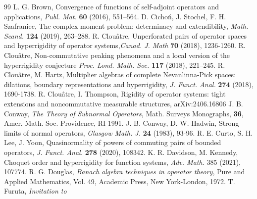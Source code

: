\documentclass[reqno]{amsproc}
\numberwithin{equation}{section}
\theoremstyle{remark}
\theoremstyle{definition}
\begin{document}
\begin{thebibliography}{99}
    L. G. Brown, Convergence of functions of
self-adjoint operators and applications,
{\em Publ. Mat.} {\bf 60} (2016), 551--564.
D. Cicho\'{n}, J. Stochel, F. H. Szafraniec, The
complex moment problem: determinacy and extendibility,
{\em Math. Scand.} {\bf 124} (2019), 263--288.
R. Clou\^{a}tre, Unperforated pairs of
operator spaces and hyperrigidity of
operator systems,{\em Canad. J. Math} {\bf
70} (2018), 1236-1260.
   R. Clou\^{a}tre, Non-commutative
peaking phenomena and a local version of the
hyperrigidity conjecture {\em Proc. Lond. Math. Soc.}
{\bf 117} (2018), 221--245.
R. Clou\^{a}tre, M. Hartz, Multiplier
algebras of complete Nevanlinna-Pick spaces:
dilations, boundary representations and
hyperrigidity, {\em J. Funct. Anal.} {\bf
274} (2018), 1690-1738.
    R. Clou\^{a}tre, I. Thompson,
Rigidity of operator systems: tight extensions and
noncommutative measurable structures, arXiv:2406.16806
    J. B. Conway, {\it The Theory of
Subnormal Operators}, Math. Surveys
Monographs, {\bf 36}, Amer. Math. Soc.
Providence, RI 1991.
    J. B. Conway,
D. W. Hadwin, Strong limits of normal
operators, {\em Glasgow Math. J.} {\bf 24}
(1983), 93-96.
R. E. Curto, S. H. Lee, J. Yoon,
Quasinormality of powers of commuting pairs
of bounded operators, {\em J. Funct. Anal.}
{\bf 278} (2020), 108342.
K. R. Davidson, M. Kennedy, Choquet order
and hyperrigidity for function systems, {\em
Adv. Math.} 385 (2021), 107774.
    R. G. Douglas, {\em Banach
algebra techniques in operator theory}, Pure
and Applied Mathematics, Vol. 49, Academic
Press, New York-London, 1972.
    T. Furuta, {\em Invitation to
}
\end{thebibliography}
\end{document}
